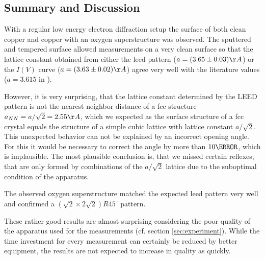 \documentclass[a4paper]{scrartcl}
\numberwithin{equation}{section}
\numberwithin{figure}{section}
\numberwithin{table}{section}
\begin{document}
\subsection{Summary and Discussion}
With a regular low energy electron diffraction setup the surface of both clean copper and copper with an oxygen superstructure was observed. The sputtered and tempered surface allowed measurements on a very clean surface so that the lattice constant obtained from either the leed pattern ($a=(3.65\pm0.03)\AA$) or the $I(V)$ curve ($a=(3.63\pm0.02)\AA$) agree very well with the literature values ($a=3.615$ in \cite{straumanis}). 

However, it is very surprising, that the lattice constant determined by the LEED pattern is not the nearest neighbor distance of a fcc structure $a_{NN} = a/\sqrt{2} = 2.55 \AA $, which we expected as the surface structure of a fcc crystal equals the structure of a simple cubic lattice with lattice constant $a/\sqrt{2}$. This unexpected behavior can not be explained by an incorrect opening angle. For this it would be necessary to correct the angle by more than $10 \degree$, which is implausible. The most plausible conclusion is, that we missed certain reflexes, that are only formed by combinations of the $a/ \sqrt{2}$ lattice due to the suboptimal condition of the apparatus. 

The observed oxygen superstructure matched the expected leed pattern very well and confirmed a $(\sqrt{2} \times 2\sqrt{2})R45^\circ$ pattern.

These rather good results are almost surprising considering the poor quality of the apparatus used for the measurements (cf. section \ref{sec:experiment}). While the time investment for every measurement can certainly be reduced by better equipment, the results are not expected to increase in quality as quickly.


\FloatBarrier
 

\end{document}
